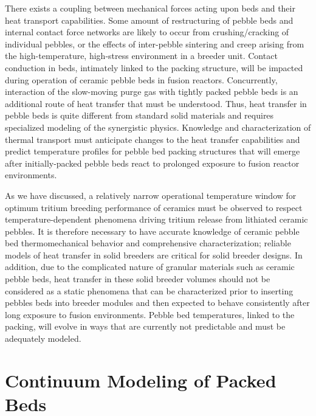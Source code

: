 \documentclass[11pt]{report} %
\begin{document}
There exists a coupling between mechanical forces acting upon beds and their heat transport capabilities. Some amount of restructuring of pebble beds and internal contact force networks are likely to occur from crushing/cracking of individual pebbles, or the effects of inter-pebble sintering and creep arising from the high-temperature, high-stress environment in a breeder unit. Contact conduction in beds, intimately linked to the packing structure, will be impacted during operation of ceramic pebble beds in fusion reactors. Concurrently, interaction of the slow-moving purge gas with tightly packed pebble beds is an additional route of heat transfer that must be understood. Thus, heat transfer in pebble beds is quite different from standard solid materials and requires specialized modeling of the synergistic physics. Knowledge and characterization of thermal transport must anticipate changes to the heat transfer capabilities and predict temperature profiles for pebble bed packing structures that will emerge after initially-packed pebble beds react to prolonged exposure to fusion reactor environments.

As we have discussed, a relatively narrow operational temperature window for optimum tritium breeding performance of ceramics must be observed to respect temperature-dependent phenomena driving tritium release from lithiated ceramic pebbles. It is therefore necessary to have accurate knowledge of ceramic pebble bed thermomechanical behavior and comprehensive characterization; reliable models of heat transfer in solid breeders are critical for solid breeder designs. In addition, due to the complicated nature of granular materials such as ceramic pebble beds, heat transfer in these solid breeder volumes should not be considered as a static phenomena that can be characterized prior to inserting pebbles beds into breeder modules and then expected to behave consistently after long exposure to fusion environments. Pebble bed temperatures, linked to the packing, will evolve in ways that are currently not predictable and must be adequately modeled.






\section{Continuum Modeling of Packed Beds}
\end{document}
